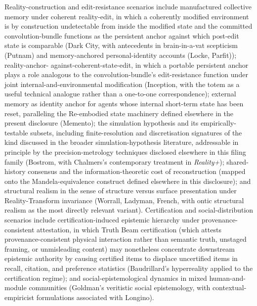 \documentclass[a4paper,12pt]{article}
\newcommand{\TB}{Truth Beam\xspace}
\begin{document}
Reality-construction and edit-resistance scenarios include
manufactured collective memory under coherent reality-edit, in
which a coherently modified environment is by construction
undetectable from inside the modified state and the committed
convolution-bundle functions as the persistent anchor against
which post-edit state is comparable (Dark City, with antecedents
in brain-in-a-vat scepticism (Putnam) and memory-anchored
personal-identity accounts (Locke, Parfit)); reality-anchor-
against-coherent-state-edit, in which a portable persistent anchor
plays a role analogous to the convolution-bundle's edit-resistance
function under joint internal-and-environmental modification
(Inception, with the totem as a useful technical analogue rather
than a one-to-one correspondence); external memory as identity
anchor for agents whose internal short-term state has been reset,
paralleling the Re-embodied state machinery defined elsewhere in
the present disclosure (Memento); the simulation hypothesis and its
empirically-testable subsets, including finite-resolution and
discretisation signatures of the kind discussed in the broader
simulation-hypothesis literature, addressable in principle by the
precision-metrology techniques disclosed elsewhere in this filing
family (Bostrom, with Chalmers's contemporary treatment in
\emph{Reality+}); shared-history consensus and the
information-theoretic cost of reconstruction (mapped onto the
Mandela-equivalence construct defined elsewhere in this
disclosure); and structural realism in the sense of structure
versus surface presentation under Reality-Transform invariance
(Worrall, Ladyman, French, with ontic structural realism as the
most directly relevant variant). Certification and
social-distribution scenarios include certification-induced
epistemic hierarchy under provenance-consistent attestation, in
which \TB certification (which attests provenance-consistent
physical interaction rather than semantic truth, unstaged framing,
or unmisleading content) may nonetheless concentrate downstream
epistemic authority by causing certified items to displace
uncertified items in recall, citation, and preference statistics
(Baudrillard's hyperreality applied to the certification regime);
and social-epistemological dynamics in mixed human-and-module
communities (Goldman's veritistic social epistemology, with
contextual-empiricist formulations associated with Longino).
\end{document}
